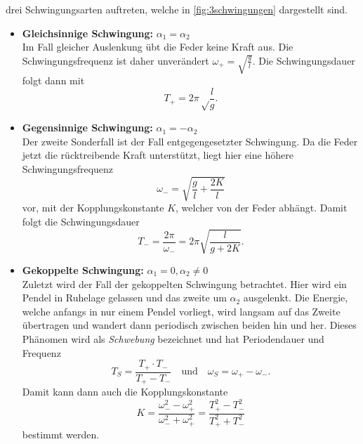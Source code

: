 drei Schwingungsarten auftreten, welche in \autoref{fig:3schwingungen} dargestellt sind.
\begin{itemize}
	\item \textbf{Gleichsinnige Schwingung:} $\alpha_1 = \alpha_2$ \\
		Im Fall gleicher Auslenkung übt die Feder keine Kraft aus. Die
		Schwingungsfrequenz ist daher unverändert $\omega_+ = \sqrt{\frac{g}{l}}$.
		Die Schwingungsdauer folgt dann mit
		\begin{equation}
			T_+ = 2\pi \sqrt\frac{l}{g}.
			\label{eqn:T_+}
		\end{equation}
	\item \textbf{Gegensinnige Schwingung:} $\alpha_1 = -\alpha_2$ \\
		Der zweite Sonderfall ist der Fall entgegengesetzter Schwingung. Da die
		Feder jetzt die rücktreibende Kraft unterstützt, liegt hier eine höhere
		Schwingungsfrequenz 
		\[
			\omega_- = \sqrt{\frac gl + \frac{2K}{l}}
		\]
		vor, mit der Kopplungskonstante $K$, welcher von der Feder abhängt. 
		Damit folgt die Schwingungsdauer
		\[
			T_- = \frac{2\pi}{\omega_-} = 2\pi \sqrt{\frac{l}{g+2K}}.
		\]
	\item \textbf{Gekoppelte Schwingung:} $\alpha_1 = 0, \alpha_2 \neq 0$ \\
		Zuletzt wird der Fall der gekoppelten Schwingung betrachtet. Hier wird ein
		Pendel in Ruhelage gelassen und das zweite um $\alpha_2$ ausgelenkt. Die
		Energie, welche anfangs in nur einem Pendel vorliegt, wird langsam auf das
		Zweite übertragen und wandert dann periodisch zwischen beiden hin und her.
		Dieses Phänomen wird als \textit{Schwebung} bezeichnet und hat
		Periodendauer und Frequenz
		\[
			T_S = \frac{T_+ \cdot T_-}{T_+ - T_-}
			\quad
			\text{und}
			\quad
			\omega_S = \omega_+ - \omega_-.
		\]
		Damit kann dann auch die Kopplungskonstante 
		\begin{equation}
			K = \frac{\omega_-^2 - \omega_+^2}{\omega_-^2 + \omega_+^2}
			=\frac{T_+^2 - T_-^2}{T_+^2 + T_-^2}
			\label{eqn:kopplungskonstante}
		\end{equation}
		bestimmt werden.
\end{itemize}
